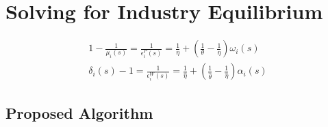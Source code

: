 \section{Solving for Industry Equilibrium}

\begin{align}
    1-\frac{1}{\mu_i(s)} = \frac{1}{\epsilon^P_i(s)} = \frac{1}{\eta} + (\frac{1}{\theta} - \frac{1}{\eta} )\omega_i(s)\\
    \delta_i(s) - 1 = \frac{1}{\epsilon^W_i(s)} = \frac{1}{\hat{\eta}} + (\frac{1}{\hat{\theta}} - \frac{1}{\hat{\eta}} )\alpha_i(s)
\end{align}

\subsection{Proposed Algorithm}
